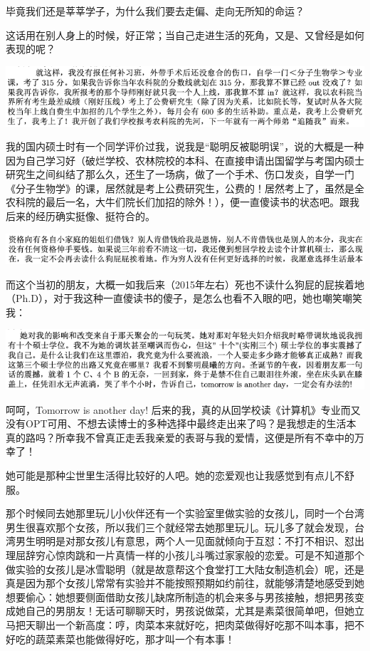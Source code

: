 \documentclass[9pt, b5paper]{article}
\begin{document}
毕竟我们还是莘莘学子，为什么我们要去走偏、走向无所知的命运？

这话用在别人身上的时候，好正常；当自己走进生活的死角，又是、又曾经是如何表现的呢？

\begin{center}
\includegraphics[width=.9\linewidth]{./pic/backups_plans_20210502_160332.png}
\end{center}

我的国内硕士时有一个同学评价过我，说我是“聪明反被聪明误”，说的大概是一种因为自己学习好（破烂学校、农林院校的本科、在直接申请出国留学与考国内硕士研究生之间纠结了那么久，还生了一场病，做了一个手术、伤口发炎，自学一门《分子生物学》的课，居然就是考上公费研究生，公费的！居然考上了，虽然是全农科院的最后一名，大牛们院长们加招的除外！），便一直傻读书的状态吧。跟我后来的经历确实挺像、挺符合的。

\begin{center}
\includegraphics[width=.9\linewidth]{./pic/backups_plans_20210502_155852.png}
\end{center}

而这个当初的朋友，大概一如我后来（2015年左右）死也不读什么狗屁的屁挨着地（Ph.D），对于我这种一直傻读书的傻子，是怎么也看不入眼的吧，她也嘲笑嘲笑我：

\begin{center}
\includegraphics[width=.9\linewidth]{./pic/backups_plans_20210502_155743.png}
\end{center}

呵呵，Tomorrow is another day! 后来的我，真的从回学校读《计算机》专业而又没有OPT可用、不想去读博士的多种选择中最终走出来了吗？是我想走的生活本真的路吗？所幸我不曾真正走丢我亲爱的表哥与我的爱情，这便是所有不幸中的万幸了！

她可能是那种尘世里生活得比较好的人吧。她的恋爱观也让我感觉到有点儿不舒服。

那个时候同去她那里玩儿小伙伴还有一个实验室里做实验的女孩儿，同时一个台湾男生很喜欢那个女孩，所以我们三个就经常去她那里玩儿。玩儿多了就会发现，台湾男生明明是对那女孩儿有意思，两个人一见面就倾向于互怼：不打不相识、怼出理屈辞穷心惊肉跳和一片真情一样的小孩儿斗嘴过家家般的恋爱。可是不知道那个做实验的女孩儿是冰雪聪明（就是故意帮这个食堂打工大陆女制造机会）呢，还是真是因为那个女孩儿常常有实验并不能按照预期如约前往，就能够清楚地感受到她想要偷心：她想要侧面借助女孩儿缺席所制造的机会来多与男孩接触，想把男孩变成她自己的男朋友！无话可聊聊天时，男孩说做菜，尤其是素菜很简单吧，但她立马把天聊出一个新高度：哼，肉菜本来就好吃，把肉菜做得好吃那不叫本事，把不好吃的蔬菜素菜也能做得好吃，那才叫一个有本事！
\end{document}
